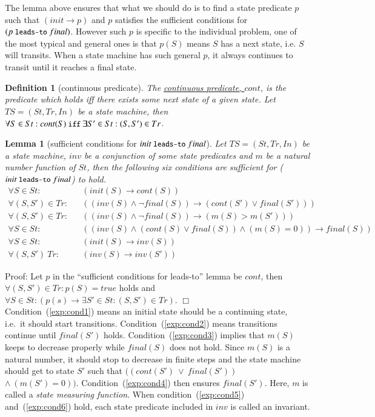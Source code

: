 \documentclass[12pt]{report}
\newtheorem{lemma}{Lemma}
\newtheorem{definition}{Definition}
\newcommand{\ra}{\rightarrow}
\newcommand{\mbstt}[1]{\mbox{\small{\tt {#1}}}}
\newcommand{\ul}{\underline}
\begin{document}
The lemma above ensures that what we should do is to find a state
predicate $p$ such that $(init\ra p)$ and $p$ satisfies the sufficient
conditions for $(p~\mbstt{leads-to}~final)$. However such $p$ is
specific to the individual problem, one of the most typical and
general ones is that $p(S)$ means $S$ has a next state, i.e. $S$ will
transits.  When a state machine has such general $p$, it always
continues to transit until it reaches a final state.

\begin{definition}[continuous predicate]
  The \ul{continuous predicate, $cont$}, is the predicate which holds
  iff there exists some next state of a given state.  Let
  $TS=(St,Tr,In)$ be a state machine, then $\forall S\in St:cont(S)
  ~\mbstt{iff}~ \exists S'\in St:(S,S')\in Tr$.
\end{definition}

\begin{lemma}[sufficient conditions for $init~\mbstt{leads-to}~final$]
  Let $TS=(St,Tr,In)$ be a state machine, $inv$ be a conjunction of
  some state predicates and $m$ be a natural number function of $St$,
  then the following six conditions are sufficient for
  ($init~\mbstt{leads-to}~final$) to hold.
  \begin{eqnarray}
  \label{exp:cond1}
  \forall S\in St:&&(init(S)\ra cont(S))\\
  \label{exp:cond2}
  \forall (S,S')\in Tr:&&((inv(S)\land\neg final(S))
  \ra(cont(S')\lor final(S')))\\
  \label{exp:cond3}
  \forall (S,S')\in Tr:&&((inv(S)\land\neg final(S))\ra(m(S)> m(S')))\\
  \label{exp:cond4}
  \forall S\in St:&&((inv(S)\land (cont(S)\lor final(S))
  \land(m(S) = 0))\ra final(S))\\
  \label{exp:cond5}
  \forall S\in St:&&(init(S)\ra inv(S))\\
  \label{exp:cond6}
  \forall (S,S')\ Tr:&&(inv(S)\ra inv(S'))
  \end{eqnarray}
\end{lemma}
Proof: Let $p$ in the ``sufficient conditions for leads-to'' lemma
be $cont$, then $\forall (S,S')\in Tr:p(S)=true$ holds and
$\forall S\in St:(p(s)\ra\exists S'\in St:(S,S')\in Tr)$. $\Box$\\

Condition~(\ref{exp:cond1}) means an initial state should be a
continuing state, i.e.\ it should start
transitions. Condition~(\ref{exp:cond2}) means transitions continue
until $final(S')$ holds. Condition~(\ref{exp:cond3}) implies that
$m(S)$ keeps to decrease properly while $final(S)$ does not
hold. Since $m(S)$ is a natural number, it should stop to decrease in
finite steps and the state machine should get to state $S'$ such that
$((cont(S')\ \lor\ final(S'))$ $\land\ (m(S') = 0))$.
Condition~(\ref{exp:cond4}) then ensures $final(S')$. Here, $m$ is
called a {\it state measuring function}. When
condition~(\ref{exp:cond5}) and~(\ref{exp:cond6}) hold, each state
predicate included in $inv$ is called an invariant.
\end{document}
